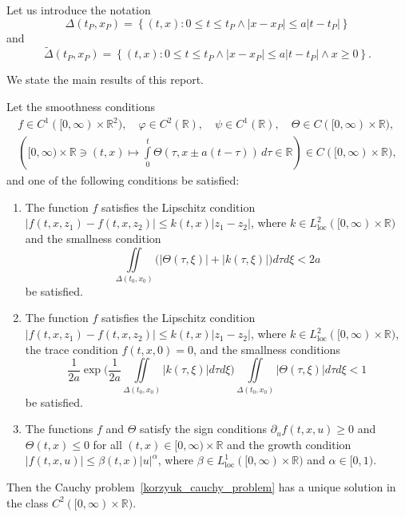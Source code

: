 \documentclass[12pt]{llncs}
\begin{document}
Let us introduce the notation
$$
\Delta( {{t}_{P}},{{x}_{P}})=\left\{ \left( t,x \right) : 0 \leq t \leq {{t}_{P}}\wedge | x-{{x}_{P}} |\leq a| t-{{t}_{P}} | \right\}
$$
and
$$
\widetilde{\Delta}( {{t}_{P}},{{x}_{P}})=\left\{ \left( t,x \right) : 0 \leq t \leq {{t}_{P}}\wedge | x-{{x}_{P}} |\leq a| t-{{t}_{P}} | \wedge x \geq 0 \right\}\!.
$$

We state the main results of this report.

\begin{theorem}\label{korzyuk_theo_cau_solve_cl} Let the smoothness conditions
  \begin{equation*}
      \begin{gathered}
          f\in C^1([0, \infty) \times \mathbb{R}^2), \quad \varphi \in C^2(\mathbb{R}), \quad \psi \in C^1(\mathbb{R}), \quad \Theta \in C([0, \infty) \times \mathbb{R}), \\
          \left([0, \infty) \times \mathbb{R} \ni (t,x)\mapsto \int\limits_{0}^{t}{\Theta ( \tau ,x\pm a( t-\tau  ))\, d\tau }\in \mathbb{R} \right)\in C([0, \infty) \times \mathbb{R}),
      \end{gathered}
  \end{equation*}
  and one of the following conditions be satisfied:
  \begin{enumerate}
      \item The function $f$ satisfies the Lipschitz condition $|f(t, x, z_1) - f(t, x, z_2)| \leq k(t, x)|z_1 - z_2|$, where $k \in L^2_\mathrm{loc}([0, \infty) \times \mathbb{R})$ and the smallness condition
      $$
      \iint\limits_{\Delta ( {{t}_{0}},{{x}_{0}} )} \big(|\Theta(\tau, \xi)| + |k(\tau, \xi)|\big) d\tau d\xi < 2 a
      $$
      be satisfied.
      \item The function $f$ satisfies the Lipschitz condition $|f(t, x, z_1) - f(t, x, z_2)| \leq k(t, x)|z_1 - z_2|$, where $k \in L^2_\mathrm{loc}([0, \infty) \times \mathbb{R})$, the trace condition $f(t, x, 0) = 0$, and the smallness conditions
      $$
        \frac{1}{2 a} \exp\!\bigg(\frac{1}{2 a}\iint\limits_{\Delta ( {{t}_{0}},{{x}_{0}} )} |k(\tau, \xi)| d\tau d\xi \bigg) \iint\limits_{\Delta ( {{t}_{0}},{{x}_{0}} )} |\Theta(\tau, \xi)| d\tau d\xi < 1
      $$
      be satisfied.
      \item The functions $f$ and $\Theta$ satisfy the sign conditions $\partial_u f(t, x, u) \geq 0$ and $\Theta(t,x) \leq 0$ for all $(t,x) \in [0, \infty) \times \mathbb{R}$ and the growth condition $|f(t,x,u)| \leq \beta(t,x) |u|^\alpha$, where $\beta \in L^1_\mathrm{loc}([0, \infty) \times \mathbb{R})$ and $\alpha \in [0, 1)$.
  \end{enumerate}
\noindent Then the Cauchy problem~\eqref{korzyuk_cauchy_problem} has a unique solution in the class $C^2([0, \infty) \times \mathbb{R})$.
\end{theorem}
\end{document}
